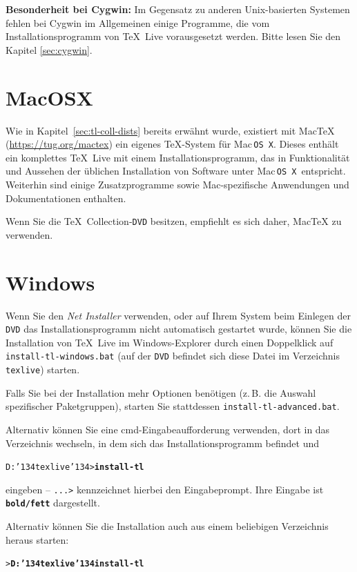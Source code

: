 \documentclass[12pt,ngerman,a4paper,fullparskip]{report}
\newcommand{\TL}{\TeX\ Live\xspace}
\newcommand{\acro}[1]{\texttt{#1}}
\newcommand{\filename}[1]{\texttt{#1}}
\newcommand{\Ucom}[1]{\textbf{\texttt{#1}}}
\newcommand{\bs}{\protect\normalfont\ttfamily\char'134}
\def\TK{\TeX\ Collection}
\providecommand*{\DVD}{\acro{DVD}\xspace}
\providecommand*{\MacOSX}{Mac\,\acro{OS\,X}\xspace}
\begin{document}
\textbf{Besonderheit bei Cygwin:} Im Gegensatz zu anderen Unix-basierten
Systemen fehlen bei Cygwin im Allgemeinen einige Programme, die vom Installationsprogramm von \TL vorausgesetzt werden. Bitte lesen Sie den Kapitel \ref{sec:cygwin}.


\section{MacOSX}

Wie in Kapitel~\ref{sec:tl-coll-dists} bereits erwähnt wurde, existiert mit Mac\TeX{} (\url{https://tug.org/mactex}) ein eigenes \TeX-System für \MacOSX. Dieses enthält ein komplettes \TL mit einem Installationsprogramm, das in Funktionalität und Aussehen  der üblichen Installation von Software unter \MacOSX\ entspricht. Weiterhin sind einige Zusatzprogramme sowie Mac-spezifische Anwendungen und Dokumentationen enthalten.

Wenn Sie die \TK-\DVD besitzen, empfiehlt es sich daher, Mac\TeX{} zu verwenden.

\section{Windows}

Wenn Sie den \emph{Net Installer} verwenden, oder auf Ihrem System beim Einlegen der \DVD das Installationsprogramm nicht automatisch gestartet wurde, können Sie die Installation von \TL im Windows-Explorer durch einen Doppelklick auf \filename{install-tl-windows.bat} (auf der \DVD befindet sich diese Datei im Verzeichnis \texttt{texlive}) starten.

Falls Sie bei der Installation mehr Optionen benötigen (z.\,B. die Auswahl
spezifischer Paketgruppen), starten Sie stattdessen \filename{install-tl-advanced.bat}.

Alternativ können Sie eine cmd-Eingabeaufforderung verwenden, dort in das Verzeichnis wechseln, in dem sich das Installationsprogramm befindet und 

\begin{alltt}
D:\bs{}texlive\bs{}> \Ucom{install-tl}
\end{alltt}

eingeben -- \texttt{...>} kennzeichnet hierbei den Eingabeprompt. Ihre Eingabe ist \Ucom{\texttt{bold/fett}} dargestellt.

Alternativ können Sie die Installation auch aus einem beliebigen Verzeichnis heraus starten:

\begin{alltt}
> \Ucom{D:\bs{}texlive\bs{}install-tl}
\end{alltt}
\end{document}
